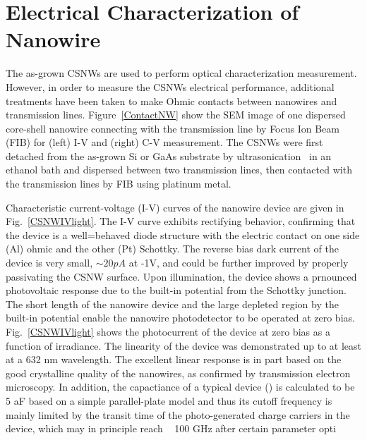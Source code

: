 \section{Electrical Characterization of Nanowire}

The as-grown CSNWs are used to perform optical characterization measurement.
However, in order to measure the CSNWs electrical performance, additional
treatments have been taken to make Ohmic contacts between nanowires and
transmission lines. Figure~\ref{ContactNW} show the SEM image of one dispersed
core-shell nanowire connecting with the transmission line by Focus Ion Beam
(FIB) for (left) I-V and (right) C-V measurement. The CSNWs were first detached
from the as-grown Si or GaAs substrate by
ultrasonication~\cite{wang2007direct,wan2004fabrication} in an ethanol bath and
dispersed between two transmission lines, then contacted with the transmission
lines by FIB using platinum metal.

Characteristic current-voltage (I-V) curves of the nanowire device are given in
Fig.~\ref{CSNWIVlight}. The I-V curve exhibits rectifying behavior, confirming
that the device is a well=behaved diode structure with the electric contact on
one side (Al) ohmic and the other (Pt) Schottky. The reverse bias dark current
of the device is very small, $\sim20pA$ at -1V, and could be further improved
by properly passivating the CSNW surface. Upon illumination, the device shows a
prnounced photovoltaic response due to the built-in potential from the Schottky
junction. The short length of the nanowire device and the large depleted region
by the built-in potential enable the nanowire photodetector to be operated at
zero bias. Fig.~\ref{CSNWIVlight} shows the photocurrent of the device at zero
bias as a function of irradiance. The linearity of the device was demonstrated
up to at least at a 632 nm wavelength. The excellent linear response is in part
based on the good crystalline quality of the nanowires, as confirmed by
transmission electron microscopy. In addition, the capactiance of a typical
device () is calculated to be 5 aF based on a simple parallel-plate model and
thus its cutoff frequency is mainly limited by the transit time of the
photo-generated charge carriers in the device, which may in principle reach ~
100 GHz after certain parameter opti 

